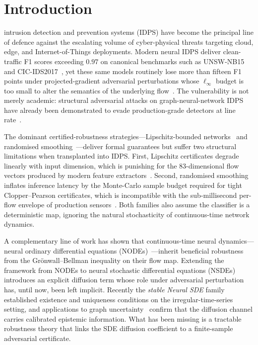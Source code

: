 \documentclass[journal,10pt]{IEEEtran}
\theoremstyle{definition}
\theoremstyle{remark}
\begin{document}
\section{Introduction}\label{sec:intro}
 intrusion detection and prevention systems
(IDPS) have become the principal line of defence against the
escalating volume of cyber-physical threats targeting cloud,
edge, and Internet-of-Things deployments. Modern neural IDPS deliver
clean-traffic F1 scores exceeding $0.97$ on canonical benchmarks
such as UNSW-NB15 and CIC-IDS2017~\cite{wu2022rtids,halbouni2022cnnlstm},
yet these same models routinely lose more than fifteen F1 points under
projected-gradient adversarial perturbations whose $\ell_\infty$
budget is too small to alter the semantics of the underlying
flow~\cite{ennaji2024advsurvey,vitorino2024advbench}. The vulnerability
is not merely academic: structural adversarial attacks on
graph-neural-network IDPS have already been demonstrated to evade
production-grade detectors at line rate~\cite{venturi2024structural}.

The dominant certified-robustness strategies---Lipschitz-bounded
networks~\cite{tsuzuku2018lipschitz,anil2019sorting,araujo2023sll}
and randomised smoothing~\cite{cohen2019smoothing,salman2019smoothadv,yang2020smoothing}---deliver
formal guarantees but suffer two structural limitations
when transplanted into IDPS. First, Lipschitz certificates degrade
linearly with input dimension, which is punishing for the
$83$-dimensional flow vectors produced by modern feature
extractors~\cite{anil2019sorting}. Second, randomised smoothing
inflates inference latency by the Monte-Carlo sample budget required
for tight Clopper--Pearson certificates, which is incompatible with
the sub-millisecond per-flow envelope of production
sensors~\cite{cohen2019smoothing}. Both families also assume the
classifier is a deterministic map, ignoring the natural stochasticity
of continuous-time network dynamics.

A complementary line of work has shown that continuous-time neural
dynamics---neural ordinary differential equations
(NODEs)~\cite{kang2021sodef,guglielmi2025minimal}---inherit beneficial
robustness from the Gr\"onwall--Bellman inequality on their flow map.
Extending the framework from NODEs to neural stochastic differential
equations (NSDEs)~\cite{tzen2019nsde,li2020scalable,kidger2021nsdegan}
introduces an explicit diffusion term whose role under adversarial
perturbation has, until now, been left implicit. Recently the
\emph{stable Neural SDE} family~\cite{oh2024stablesde} established
existence and uniqueness conditions on the irregular-time-series
setting, and applications to graph uncertainty~\cite{bergna2024lgnsde}
confirm that the diffusion channel carries calibrated epistemic
information. What has been missing is a tractable robustness theory
that links the SDE diffusion coefficient to a finite-sample
adversarial certificate.
\end{document}
